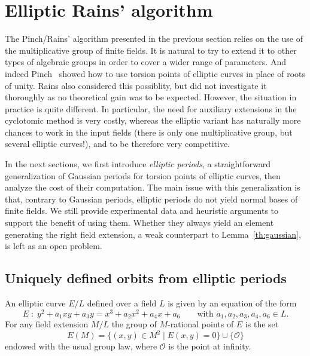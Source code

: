 \documentclass[12pt]{article}
\theoremstyle{plain}
\theoremstyle{definition}
\newcounter{algorithm}
\begin{document}

\section{Elliptic Rains' algorithm}
\label{sec:rains-elliptic}

The Pinch/Rains' algorithm presented in the previous section relies on the use
of the multiplicative group of finite fields.
It is natural to try to extend it to other types of algebraic groups in
order to cover a wider range of parameters.
And indeed Pinch~\cite{Pinch} showed how to use torsion points of elliptic
curves in place of roots of unity.
Rains also considered this possiblity, but did not investigate it thoroughly
as no theoretical gain was to be expected.
However, the situation in practice is quite different.
In particular, the need for auxiliary extensions in the cyclotomic method
is very costly, whereas the elliptic variant has naturally more chances
to work in the input fields (there is only one multiplicative group,
but several elliptic curves!), and to be therefore very competitive.

In the next sections, we first introduce \emph{elliptic periods}, a
straightforward generalization of Gaussian periods for torsion points
of elliptic curves,
then analyze the cost of their computation.
The main issue with this generalization is that, contrary to Gaussian periods,
elliptic periods do not yield normal bases of finite fields.
We still provide experimental data and heuristic arguments
to support the benefit of using them.
Whether they always yield an element generating the right field extension,
a weak counterpart to Lemma~\ref{th:gaussian}, is left as an open problem.

\subsection{Uniquely defined orbits from elliptic periods}
\label{sec:ellperiods}

An elliptic curve $E/L$ defined over a field $L$ is given by an
equation of the form
\begin{equation*}
  E\;:\; y^2 + a_1xy + a_3y = x^3 + a_2x^2 + a_4x + a_6
  \qquad\text{with $a_1,a_2,a_3,a_4,a_6\in L$.}
\end{equation*}
For any field extension $M/L$ the group of $M$-rational points of $E$
is the set
\begin{equation*}
  E(M) = \{(x,y)\in M^2 \mid E(x,y) = 0\} \cup \{\mathcal{O}\}
\end{equation*}
endowed with the usual group law, where $\mathcal{O}$ is the point at
infinity.
\end{document}
